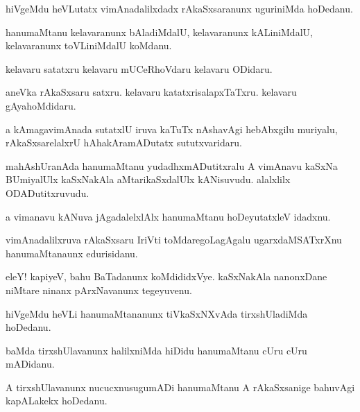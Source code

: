 \documentclass{article}
\begin{document}
\begin{mn}%
hiVgeMdu heVLutatx vimAnadalilxdadx rAkaSxsaranunx uguriniMda hoDedanu.
\end{mn}

\begin{mn}%
hanumaMtanu kelavaranunx bAladiMdalU, kelavaranunx kALiniMdalU, kelavaranunx toVLiniMdalU 
koMdanu.
\end{mn}

\begin{mn}%
kelavaru satatxru kelavaru mUCeRhoVdaru kelavaru ODidaru.
\end{mn}

\begin{mn}%
aneVka rAkaSxsaru satxru. kelavaru katatxrisalapxTaTxru. kelavaru gAyahoMdidaru.
\end{mn}

\begin{mn}%
a kAmagavimAnada sutatxlU iruva kaTuTx nAshavAgi hebAbxgilu muriyalu, rAkaSxsarelalxrU 
hAhakAramADutatx sututxvaridaru.
\end{mn}

\begin{mn}%
mahAshUranAda hanumaMtanu yudadhxmADutitxralu A vimAnavu kaSxNa BUmiyalUlx kaSxNakAla 
aMtarikaSxdalUlx kANisuvudu. alalxlilx ODADutitxruvudu.
\end{mn}

\begin{mn}%
a vimanavu kANuva jAgadalelxlAlx hanumaMtanu hoDeyutatxleV idadxnu.
\end{mn}

\begin{mn}%
vimAnadalilxruva rAkaSxsaru IriVti toMdaregoLagAgalu ugarxdaMSATxrXnu hanumaMtanaunx 
edurisidanu.
\end{mn}

\begin{mn}%
eleY! kapiyeV, bahu BaTadanunx koMdididxVye. kaSxNakAla nanonxDane niMtare ninanx 
pArxNavanunx tegeyuvenu.
\end{mn}

\begin{mn}%
hiVgeMdu heVLi hanumaMtananunx tiVkaSxNXvAda tirxshUladiMda hoDedanu.
\end{mn}

\begin{mn}%
baMda tirxshUlavanunx halilxniMda hiDidu hanumaMtanu cUru cUru mADidanu.
\end{mn}

\begin{mn}%
A tirxshUlavanunx nucucxnusugumADi hanumaMtanu A rAkaSxsanige bahuvAgi kapALakekx hoDedanu.
\end{mn}
\end{document}

